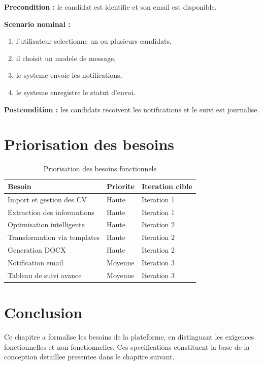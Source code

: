 \textbf{Precondition :} le candidat est identifie et son email est disponible.

\textbf{Scenario nominal :}
\begin{enumerate}
    \item l'utilisateur selectionne un ou plusieurs candidats,
    \item il choisit un modele de message,
    \item le systeme envoie les notifications,
    \item le systeme enregistre le statut d'envoi.
\end{enumerate}

\textbf{Postcondition :} les candidats recoivent les notifications et le suivi est journalise.

\section{Priorisation des besoins}
\begin{table}[!ht]
\centering
\begin{tabular}{p{6cm}p{3cm}p{3cm}}
\toprule
\textbf{Besoin} & \textbf{Priorite} & \textbf{Iteration cible} \\
\midrule
Import et gestion des CV & Haute & Iteration 1 \\
Extraction des informations & Haute & Iteration 1 \\
Optimisation intelligente & Haute & Iteration 2 \\
Transformation via templates & Haute & Iteration 2 \\
Generation DOCX & Haute & Iteration 2 \\
Notification email & Moyenne & Iteration 3 \\
Tableau de suivi avance & Moyenne & Iteration 3 \\
\bottomrule
\end{tabular}
\caption{Priorisation des besoins fonctionnels}
\label{tab:priorisation-besoins}
\end{table}

\section{Conclusion}
Ce chapitre a formalise les besoins de la plateforme, en distinguant les exigences fonctionnelles et non fonctionnelles. Ces specifications constituent la base de la conception detaillee presentee dans le chapitre suivant.
